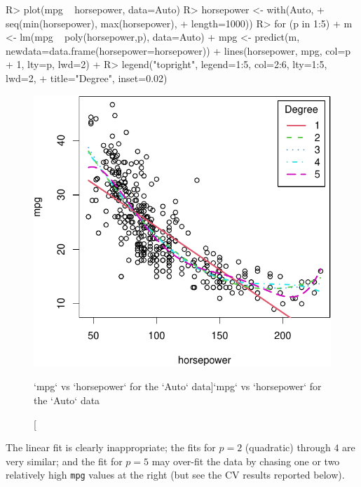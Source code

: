 \documentclass[
]{jss}
\begin{document}
\begin{CodeChunk}
\begin{CodeInput}
R> plot(mpg ~ horsepower, data=Auto)
R> horsepower <- with(Auto, 
+                    seq(min(horsepower), max(horsepower), 
+                        length=1000))
R> for (p in 1:5){
+   m <- lm(mpg ~ poly(horsepower,p), data=Auto)
+   mpg <- predict(m, newdata=data.frame(horsepower=horsepower))
+   lines(horsepower, mpg, col=p + 1, lty=p, lwd=2)
+ }
R> legend("topright", legend=1:5, col=2:6, lty=1:5, lwd=2,
+        title="Degree", inset=0.02)
\end{CodeInput}
\begin{figure}

{\centering \includegraphics[width=1\linewidth]{JSS-article_files/figure-latex/mpg-horsepower-scatterplot-polynomials-1} 

}

\caption[`mpg` vs `horsepower` for the `Auto` data]{`mpg` vs `horsepower` for the `Auto` data}\label{fig:mpg-horsepower-scatterplot-polynomials}
\end{figure}
\end{CodeChunk}

The linear fit is clearly inappropriate; the fits for \(p = 2\)
(quadratic) through \(4\) are very similar; and the fit for \(p = 5\)
may over-fit the data by chasing one or two relatively high \texttt{mpg}
values at the right (but see the CV results reported below).
\end{document}
